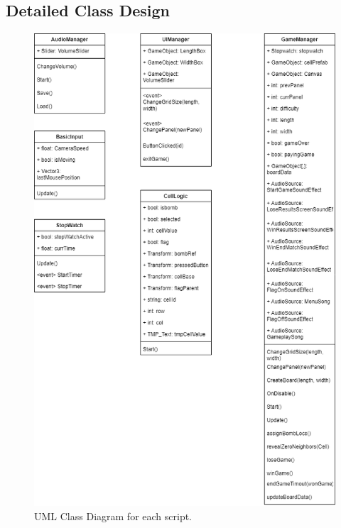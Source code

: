 \newpage

\subsection{Detailed Class Design}
\label{subsec:DCDesign}

\begin{figure}[!htb]
    \centering
    \includegraphics[width=\textwidth,height=\textheight,keepaspectratio]{Images/DCDesignLogView.png}
       \caption{UML Class Diagram for each script.}
           \label{Fig:DCDesignLogView}
\end{figure}